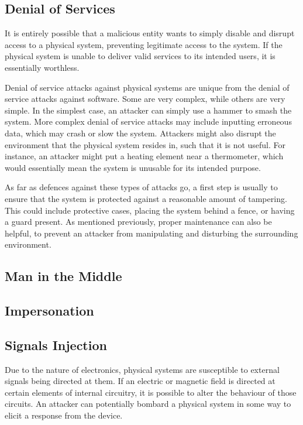 \subsection{Denial of Services}
It is entirely possible that a malicious entity wants to simply disable and disrupt access to a physical system, preventing legitimate access
to the system. If the physical system is unable to deliver valid services to its intended users, it is essentially worthless. 

Denial of service attacks against physical systems are unique from the denial of service attacks against software. Some are very complex,
while others are very simple. In the simplest case, an attacker can simply use a hammer to smash the system. More complex denial of
service attacks may include inputting erroneous data, which may crash or slow the system. Attackers might also disrupt the environment
that the physical system resides in, such that it is not useful. For instance, an attacker might put a heating element near a thermometer,
which would essentially mean the system is unusable for its intended purpose.

As far as defences against these types of attacks go, a first step is usually to ensure that the system is protected against a reasonable
amount of tampering. This could include protective cases, placing the system behind a fence, or having a guard present. As mentioned
previously, proper maintenance can also be helpful, to prevent an attacker from manipulating and disturbing the surrounding
environment.

\subsection{Man in the Middle}

\subsection{Impersonation}

\subsection{Signals Injection}
Due to the nature of electronics, physical systems are susceptible to external signals being directed at them. If an electric or 
magnetic field is directed at certain elements of internal circuitry, it is possible to alter the behaviour of those circuits. An attacker
can potentially bombard a physical system in some way to elicit a response from the device.

